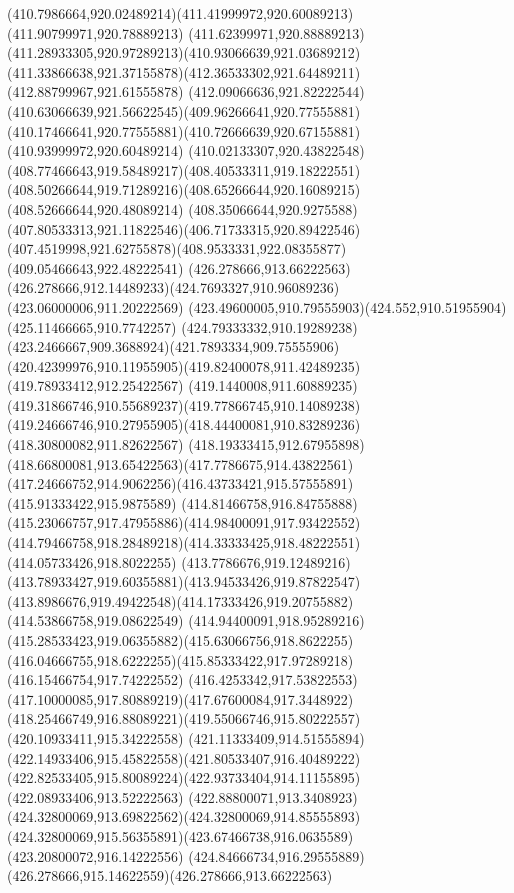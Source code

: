 {{{{				\curveto(410.7986664,920.02489214)(411.41999972,920.60089213)(411.90799971,920.78889213)
				\curveto(411.62399971,920.88889213)(411.28933305,920.97289213)(410.93066639,921.03689212)
				\curveto(411.33866638,921.37155878)(412.36533302,921.64489211)(412.88799967,921.61555878)
				\curveto(412.09066636,921.82222544)(410.63066639,921.56622545)(409.96266641,920.77555881)
				\curveto(410.17466641,920.77555881)(410.72666639,920.67155881)(410.93999972,920.60489214)
				\curveto(410.02133307,920.43822548)(408.77466643,919.58489217)(408.40533311,919.18222551)
				\curveto(408.50266644,919.71289216)(408.65266644,920.16089215)(408.52666644,920.48089214)
				\curveto(408.35066644,920.9275588)(407.80533313,921.11822546)(406.71733315,920.89422546)
				\curveto(407.4519998,921.62755878)(408.9533331,922.08355877)(409.05466643,922.48222541)
				\moveto(426.278666,913.66222563)
				\curveto(426.278666,912.14489233)(424.7693327,910.96089236)(423.06000006,911.20222569)
				\curveto(423.49600005,910.79555903)(424.552,910.51955904)(425.11466665,910.7742257)
				\curveto(424.79333332,910.19289238)(423.2466667,909.3688924)(421.7893334,909.75555906)
				\curveto(420.42399976,910.11955905)(419.82400078,911.42489235)(419.78933412,912.25422567)
				\curveto(419.1440008,911.60889235)(419.31866746,910.55689237)(419.77866745,910.14089238)
				\curveto(419.24666746,910.27955905)(418.44400081,910.83289236)(418.30800082,911.82622567)
				\curveto(418.19333415,912.67955898)(418.66800081,913.65422563)(417.7786675,914.43822561)
				\curveto(417.24666752,914.9062256)(416.43733421,915.57555891)(415.91333422,915.9875589)
				\curveto(414.81466758,916.84755888)(415.23066757,917.47955886)(414.98400091,917.93422552)
				\curveto(414.79466758,918.28489218)(414.33333425,918.48222551)(414.05733426,918.8022255)
				\curveto(413.7786676,919.12489216)(413.78933427,919.60355881)(413.94533426,919.87822547)
				\curveto(413.8986676,919.49422548)(414.17333426,919.20755882)(414.53866758,919.08622549)
				\curveto(414.94400091,918.95289216)(415.28533423,919.06355882)(415.63066756,918.8622255)
				\curveto(416.04666755,918.6222255)(415.85333422,917.97289218)(416.15466754,917.74222552)
				\curveto(416.4253342,917.53822553)(417.10000085,917.80889219)(417.67600084,917.3448922)
				\curveto(418.25466749,916.88089221)(419.55066746,915.80222557)(420.10933411,915.34222558)
				\curveto(421.11333409,914.51555894)(422.14933406,915.45822558)(421.80533407,916.40489222)
				\curveto(422.82533405,915.80089224)(422.93733404,914.11155895)(422.08933406,913.52222563)
				\curveto(422.88800071,913.3408923)(424.32800069,913.69822562)(424.32800069,914.85555893)
				\curveto(424.32800069,915.56355891)(423.67466738,916.0635589)(423.20800072,916.14222556)
				\curveto(424.84666734,916.29555889)(426.278666,915.14622559)(426.278666,913.66222563)
			}
		}
	}
}